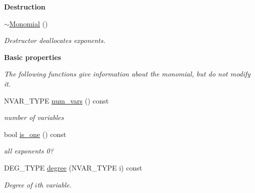 \begin{Indent}\textbf{ Destruction}\par
\begin{DoxyCompactItemize}
\item 
\mbox{\label{group__polygroup_a7c56cfe0292638732d60169d960f877c}} 
\hyperlink{group__polygroup_a7c56cfe0292638732d60169d960f877c}{$\sim$\+Monomial} ()
\begin{DoxyCompactList}\small\item\em Destructor deallocates exponents. \end{DoxyCompactList}\end{DoxyCompactItemize}
\end{Indent}
\begin{Indent}\textbf{ Basic properties}\par
{\em The following functions give information about the monomial, but do not modify it. }\begin{DoxyCompactItemize}
\item 
\mbox{\label{group__polygroup_a4ade87fb2cae33669c66c7b23819ba57}} 
N\+V\+A\+R\+\_\+\+T\+Y\+PE \hyperlink{group__polygroup_a4ade87fb2cae33669c66c7b23819ba57}{num\+\_\+vars} () const
\begin{DoxyCompactList}\small\item\em number of variables \end{DoxyCompactList}\item 
\mbox{\label{group__polygroup_aa1508ad890693aee2f5c35e156f12e83}} 
bool \hyperlink{group__polygroup_aa1508ad890693aee2f5c35e156f12e83}{is\+\_\+one} () const
\begin{DoxyCompactList}\small\item\em all exponents 0? \end{DoxyCompactList}\item 
\mbox{\label{group__polygroup_a817508c95fe721c56c78d91975b8416b}} 
D\+E\+G\+\_\+\+T\+Y\+PE \hyperlink{group__polygroup_a817508c95fe721c56c78d91975b8416b}{degree} (N\+V\+A\+R\+\_\+\+T\+Y\+PE i) const
\begin{DoxyCompactList}\small\item\em Degree of $i$th variable. \end{DoxyCompactList}\item 
\mbox{\label{group__polygroup_ab3c18ba0fe7442e07d630bddea3469b5}} 

\end{DoxyCompactItemize}
\end{Indent}

